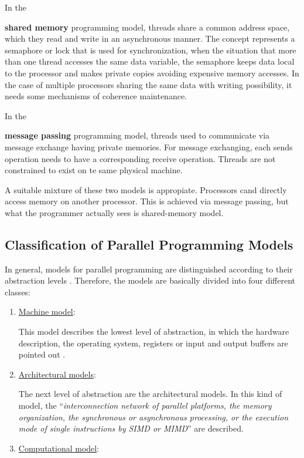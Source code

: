 In the {\textbf{shared memory} programming model, threads share a common address space, which they read and write in an asynchronous manner. The concept represents a semaphore or lock that is used for synchronization, when the situation that more than one thread accesses the same data variable, the semaphore keeps data local to the processor and makes private copies avoiding expensive memory accesses. In the case of multiple processors sharing the same data with writing possibility, it needs some mechanisms of coherence maintenance.
	
In the {\textbf{message passing} programming model, threads used to communicate via message exchange having private memories. For message exchanging, each sends operation needs to have a corresponding receive operation. Threads are not constrained to exist on te same physical machine. 
	
A suitable mixture of these two models is appropiate. Processors cand directly access memory on another processor. This is achieved via message passing, but what the programmer actually sees is shared-memory model.
\subsection{Classification of Parallel Programming Models}

In general, models for parallel programming are distinguished according to their abstraction levels \parencite{book1}. Therefore, the models are basically divided into four different classes:

\begin{enumerate}
	\item \underline{Machine model}:
	
	This model describes the lowest level of abstraction, in which the hardware description, the operating system, registers or input and output buffers are pointed out \parencite[see][p105]{book1}. 
	
	\item \underline{Architectural models}:
	
	The next level of abstraction are the architectural models. In this kind of model, the ``\textit{interconnection network of parallel platforms, the memory organization, the synchronous or asynchronous processing, or the execution mode of single instructions by SIMD or MIMD}'' \parencite[see][p105-106]{book1} are described.
	
	\item \underline{Computational model}:
	

\end{enumerate}}}
